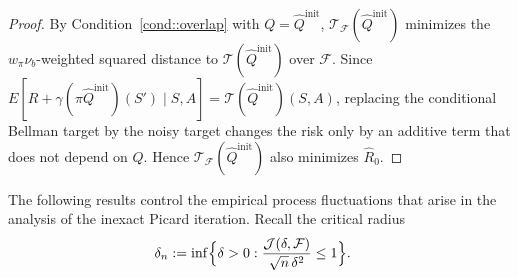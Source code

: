 \documentclass{article}
\theoremstyle{plain}
\theoremstyle{definition}
\theoremstyle{remark}
\begin{document}
\begin{proof}
By Condition~\ref{cond::overlap} with \(Q=\hat Q^{\mathrm{init}}\),
\(\mathcal T_{\mathcal F}(\hat Q^{\mathrm{init}})\) minimizes the
\(w_\pi\nu_b\)-weighted squared distance to
\(\mathcal T(\hat Q^{\mathrm{init}})\) over \(\mathcal F\). Since
\(E[R+\gamma(\pi\hat Q^{\mathrm{init}})(S')\mid S,A]
=\mathcal T(\hat Q^{\mathrm{init}})(S,A)\), replacing the conditional Bellman
target by the noisy target changes the risk only by an additive term that does
not depend on \(Q\). Hence
\(\mathcal T_{\mathcal F}(\hat Q^{\mathrm{init}})\) also minimizes
\(\hat R_0\).
\end{proof}




 

 

 
 

 

 


 The following results control the empirical process fluctuations that arise in the analysis of the inexact Picard iteration.
Recall the critical radius
\begin{align*}
\delta_{n}
&:=
\inf\Bigl\{
\delta > 0 :
\frac{\mathcal{J}(\delta,  \mathcal F)}{\sqrt{n}\,\delta^2}
\le 1
\Bigr\}.
\end{align*}
\end{document}
